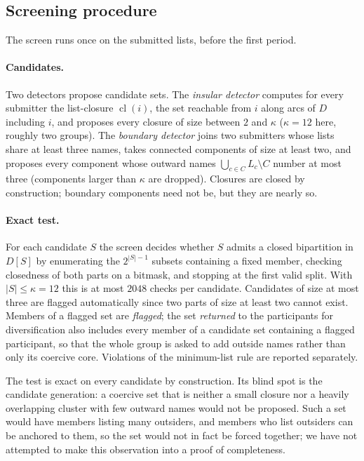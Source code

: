 \documentclass[11pt,a4paper]{article}
\theoremstyle{plain}
\theoremstyle{definition}
\theoremstyle{remark}
\newcommand{\cl}{\operatorname{cl}}
\begin{document}
\subsection{Screening procedure}
\label{sec:screen}
The screen runs once on the submitted lists, before the first period.

\paragraph{Candidates.} Two detectors propose candidate sets. The \emph{insular detector} computes for every submitter the list-closure $\cl(i)$, the set reachable from $i$ along arcs of $D$ including $i$, and proposes every closure of size between $2$ and $\kappa$ ($\kappa = 12$ here, roughly two groups). The \emph{boundary detector} joins two submitters whose lists share at least three names, takes connected components of size at least two, and proposes every component whose outward names $\bigcup_{c \in C} L_c \setminus C$ number at most three (components larger than $\kappa$ are dropped). Closures are closed by construction; boundary components need not be, but they are nearly so.

\paragraph{Exact test.} For each candidate $S$ the screen decides whether $S$ admits a closed bipartition in $D[S]$ by enumerating the $2^{|S|-1}$ subsets containing a fixed member, checking closedness of both parts on a bitmask, and stopping at the first valid split. With $|S| \le \kappa = 12$ this is at most $2048$ checks per candidate. Candidates of size at most three are flagged automatically since two parts of size at least two cannot exist. Members of a flagged set are \emph{flagged}; the set \emph{returned} to the participants for diversification also includes every member of a candidate set containing a flagged participant, so that the whole group is asked to add outside names rather than only its coercive core. Violations of the minimum-list rule are reported separately.

The test is exact on every candidate by construction. Its blind spot is the candidate generation: a coercive set that is neither a small closure nor a heavily overlapping cluster with few outward names would not be proposed. Such a set would have members listing many outsiders, and members who list outsiders can be anchored to them, so the set would not in fact be forced together; we have not attempted to make this observation into a proof of completeness.
\end{document}
